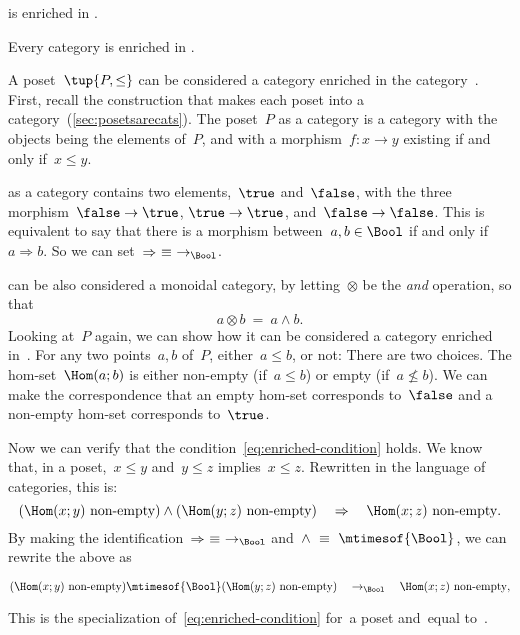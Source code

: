\begin{example}
	\Category is enriched in \Category.
\end{example}

\begin{example}
	Every category is enriched in \Set.
\end{example}

\begin{example}
	A poset~$\tup{P, \leq}$ can be considered a category enriched in the category~\Bool.
	First, recall the construction that makes each poset into a category~(\cref{sec:posetsarecats}).
	The poset~$P$ as a category is a category with the objects being the elements of~$P$, and with a morphism~$f\colon x \to y$ existing if and only if~$x\leq y$.

	\Bool as a category contains two elements,~$\true$ and~$\false$, with the three morphism~$\false \to \true$, $\true \to \true$, and~$\false \to \false$.
	This is equivalent to say that there is a morphism between~$a, b \in \Bool$ if and only if~$a \Rightarrow b$.
	So we can set~$\Rightarrow\ \equiv\ \to_{\Bool}$.

	\Bool can be also considered a monoidal category, by letting~$\otimes$ be the \emph{and} operation, so that
	\begin{equation}
		a \otimes b\ =\ a \wedge b.
	\end{equation}
	Looking at~$P$ again, we can show how it can be considered a category enriched in~\Bool.
	For any two points~$a, b$ of~$P$, either~$a \leq b$, or not: There are two choices.
	The hom-set~$\Hom(a; b)$ is either non-empty (if~$a \leq b$) or empty (if~$a \not\leq b$).
	We can make the correspondence that an empty hom-set corresponds to~$\false$ and a non-empty hom-set corresponds to~$\true$.

	Now we can verify that the condition~\cref{eq:enriched-condition} holds.
	We know that, in a poset,~$x \leq y$ and~$y \leq z$ implies~$x \leq z$.
	Rewritten in the language of categories, this is:
	\begin{equation*}
		(\Hom(x;y)\ \text{non-empty})
		\wedge
		(\Hom(y; z)\ \text{non-empty})
		\quad
		\Rightarrow
		\quad
		\Hom(x; z)\ \text{non-empty}.
	\end{equation*}
	By making the identification~$\Rightarrow\ \equiv\ \to_{\Bool}$ and~$\wedge\ \equiv\ \mtimesof{\Bool}$, we can rewrite the above as
	\begin{widepar}
		\begin{equation*}
			(\Hom(x;y)\ \text{non-empty})
			\mtimesof{\Bool}
			(\Hom(y; z)\ \text{non-empty})
			\quad
			\to_{\Bool}
			\quad
			\Hom(x; z)\ \text{non-empty},
		\end{equation*}
	\end{widepar}
	This is the specialization of~\cref{eq:enriched-condition} for~\CatC a poset and~\CatD equal to~\Bool.
\end{example}

